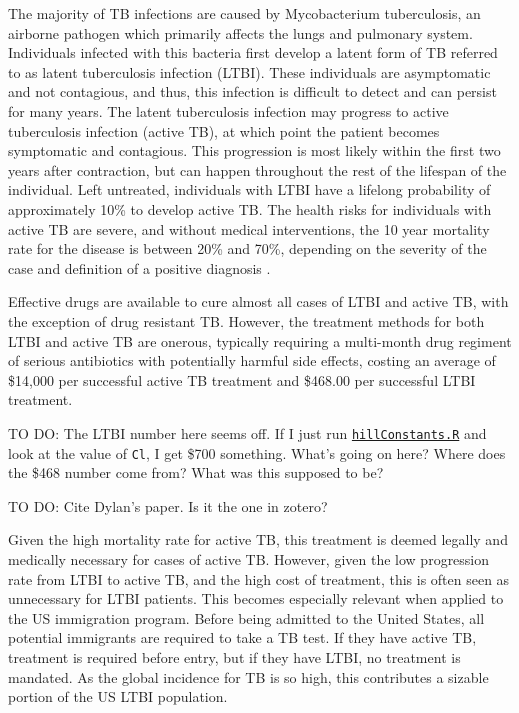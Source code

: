\documentclass{amsart}
\renewcommand{\(}{\left(}
\renewcommand{\)}{\right)}
\newcommand{\TODO}[1]{\begin{framed}{\huge \color{red} TO DO:}
  #1 \end{framed}}
\begin{document}
The majority of TB infections are caused by Mycobacterium tuberculosis, 
an airborne pathogen which primarily affects the lungs and pulmonary system.  
Individuals infected with this bacteria first develop a latent form of TB
referred to as latent tuberculosis infection (LTBI).  These individuals are
asymptomatic and not contagious, and thus, this infection is difficult to detect
and can persist for many years. The latent tuberculosis infection may progress
to active tuberculosis infection (active TB), at which point the patient becomes
symptomatic and contagious. This progression is most likely within the first two
years after contraction, but can happen throughout the rest of the lifespan of
the individual.  Left untreated, individuals with LTBI have a lifelong
probability of approximately 10\% to develop active TB. The health risks for
individuals with active TB are severe, and without medical interventions, the 10
year mortality rate for the disease is between 20\% and 70\%, depending on the
severity of the case and definition of a positive diagnosis
\cite{_who_2013,tufariello_latent_2003}.

Effective drugs are available to cure almost all cases of LTBI and active TB,
with the exception of drug resistant TB. However, the treatment methods for both
LTBI and active TB are onerous, typically requiring a multi-month drug regiment
of serious antibiotics with potentially harmful side effects, costing an average
of \$14,000 per successful active TB treatment and \$468.00 per successful LTBI
treatment. 
\TODO{The LTBI number here seems off. If I just run
  \href{https://github.com/mmcdermott/disease-modeling/blob/master/in_progress/models/costBenefitAnalysis/hillConstants.R}{\texttt{hillConstants.R}}
  and look at the value of \texttt{Cl}, I get \$700 something. What's going on
  here? Where does the \$468 number come from? What was this supposed to be?}
\TODO{Cite Dylan's paper. Is it the one in zotero?}
Given the high mortality rate for active TB, this treatment is deemed legally
and medically necessary for cases of active TB. However, given the low
progression rate from LTBI to active TB, and the high cost of treatment, this is
often seen as unnecessary for LTBI patients. This becomes especially relevant
when applied to the US immigration program. Before being admitted to the United
States, all potential immigrants are required to take a TB test. If they have
active TB, treatment is required before entry, but if they have LTBI, no
treatment is mandated. As the global incidence for TB is so high, this
contributes a sizable portion of the US LTBI population.
\end{document}

